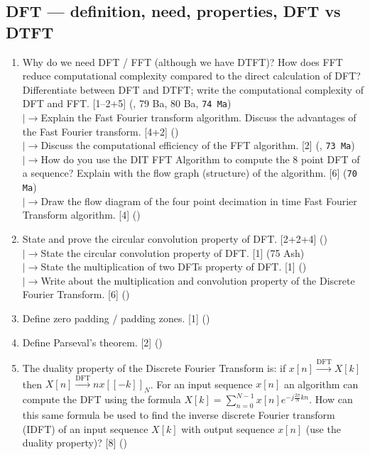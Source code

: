 \documentclass[12pt]{article}
\newcommand{\lb}{\\$\left|\rightarrow\right.$}
\begin{document}
  \subsection{DFT --- definition, need, properties, DFT vs DTFT}
    \begin{enumerate}[topsep=0pt, noitemsep]
      \item Why do we need DFT / FFT (although we have DTFT)? How does FFT reduce computational complexity compared to the direct calculation of DFT? Differentiate between DFT and DTFT; write the computational complexity of DFT and FFT. \hfill [1--2+5] (, 79 Ba, 80 Ba, \texttt{74 Ma})
        \lb Explain the Fast Fourier transform algorithm. Discuss the advantages of the Fast Fourier transform. \hfill [4+2] ()
        \lb Discuss the computational efficiency of the FFT algorithm. \hfill [2] (, \texttt{73 Ma})
        \lb How do you use the DIT FFT Algorithm to compute the 8 point DFT of a sequence? Explain with the flow graph (structure) of the algorithm. \hfill [6] (\texttt{70 Ma})
        \lb Draw the flow diagram of the four point decimation in time Fast Fourier Transform algorithm. \hfill [4] ()
      \item State and prove the circular convolution property of DFT. \hfill [2+2+4] ()
        \lb State the circular convolution property of DFT. \hfill [1] (75 Ash)
        \lb State the multiplication of two DFTs property of DFT. \hfill [1] ()
        \lb Write about the multiplication and convolution property of the Discrete Fourier Transform. \hfill [6] ()
      \item Define zero padding / padding zones. \hfill [1] ()
      \item Define Parseval's theorem. \hfill [2] ()
      \item The duality property of the Discrete Fourier Transform is: if $x[n]\xrightarrow{\text{DFT}}X[k]$ then $X[n]\xrightarrow{\text{DFT}}nx[[-k]]_N$. For an input sequence $x[n]$ an algorithm can compute the DFT using the formula $X[k]=\sum_{n=0}^{N-1}x[n]e^{-j\frac{2\pi}{N}kn}$. How can this same formula be used to find the inverse discrete Fourier transform (IDFT) of an input sequence $X[k]$ with output sequence $x[n]$ (use the duality property)? \hfill [8] ()
    \end{enumerate}
\end{document}
